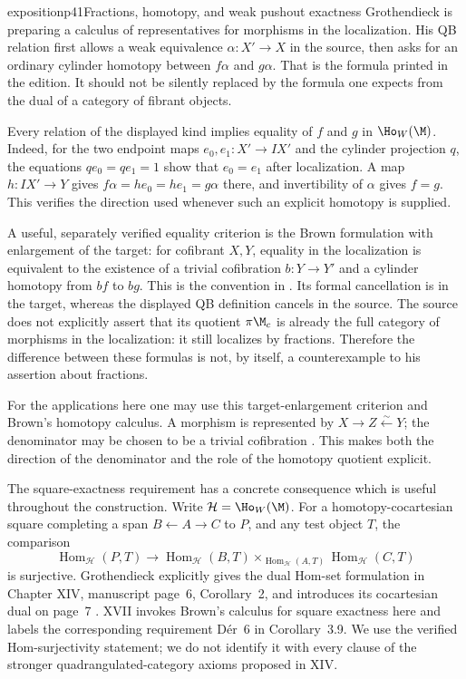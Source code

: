 \begin{dcomment}{exposition}{p41}{Fractions, homotopy, and weak pushout exactness}
Grothendieck is preparing a calculus of representatives for morphisms in the localization. His QB relation first allows a weak equivalence $\alpha:X'\to X$ in the source, then asks for an ordinary cylinder homotopy between $f\alpha$ and $g\alpha$. That is the formula printed in the edition. It should not be silently replaced by the formula one expects from the dual of a category of fibrant objects.

Every relation of the displayed kind implies equality of $f$ and $g$ in $\Ho_W(\M)$. Indeed, for the two endpoint maps $e_0,e_1:X'\to IX'$ and the cylinder projection $q$, the equations $qe_0=qe_1=1$ show that $e_0=e_1$ after localization. A map $h:IX'\to Y$ gives $f\alpha=he_0=he_1=g\alpha$ there, and invertibility of $\alpha$ gives $f=g$. This verifies the direction used whenever such an explicit homotopy is supplied.

A useful, separately verified equality criterion is the Brown formulation with enlargement of the target: for cofibrant $X,Y$, equality in the localization is equivalent to the existence of a trivial cofibration $b:Y\to Y'$ and a cylinder homotopy from $bf$ to $bg$. This is the convention in \citet[Section 6.3, diagram (6.1), and Theorem 6.3.1]{RadulescuBanu2009}. Its formal cancellation is in the target, whereas the displayed QB definition cancels in the source. The source does not explicitly assert that its quotient $\pi\M_c$ is already the full category of morphisms in the localization: it still localizes by fractions. Therefore the difference between these formulas is not, by itself, a counterexample to his assertion about fractions.

For the applications here one may use this target-enlargement criterion and Brown's homotopy calculus. A morphism is represented by $X\to Z\xleftarrow{\sim}Y$; the denominator may be chosen to be a trivial cofibration \citep[Theorem 6.4.5(1)(a)]{RadulescuBanu2009}. This makes both the direction of the denominator and the role of the homotopy quotient explicit.

The square-exactness requirement has a concrete consequence which is useful throughout the construction. Write $\mathcal H=\Ho_W(\M)$. For a homotopy-cocartesian square completing a span $B\leftarrow A\to C$ to $P$, and any test object $T$, the comparison
\[
 \operatorname{Hom}_{\mathcal H}(P,T)\longrightarrow
 \operatorname{Hom}_{\mathcal H}(B,T)
 \times_{\operatorname{Hom}_{\mathcal H}(A,T)}
 \operatorname{Hom}_{\mathcal H}(C,T)
\]
is surjective. Grothendieck explicitly gives the dual Hom-set formulation in Chapter XIV, manuscript page~6, Corollary~2, and introduces its cocartesian dual on page~7 \citep{GrothendieckDerivateursXIV}. XVII invokes Brown's calculus for square exactness here and labels the corresponding requirement D\'er~6 in Corollary~3.9. We use the verified Hom-surjectivity statement; we do not identify it with every clause of the stronger quadrangulated-category axioms proposed in XIV.


\end{dcomment}
